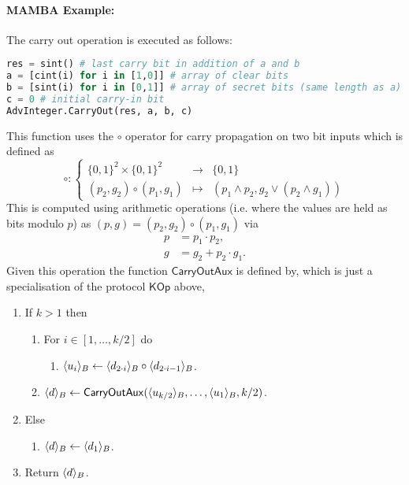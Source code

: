\paragraph{MAMBA Example:}  The carry out operation is executed as follows: 
\begin{lstlisting}[language={python}]
res = sint() # last carry bit in addition of a and b
a = [cint(i) for i in [1,0]] # array of clear bits
b = [sint(i) for i in [0,1]] # array of secret bits (same length as a)
c = 0 # initial carry-in bit
AdvInteger.CarryOut(res, a, b, c)
\end{lstlisting}

This function uses the $\circ$ operator for carry propagation on two
bit inputs which is defined as
\[  \circ:  \left\{ \begin{array}{ccc}
			\{0,1\}^2 \times \{0,1\}^2 & \longrightarrow & \{0,1\} \\
			(p_2,g_2) \circ (p_1,g_1) & \longmapsto &
			 (p_1 \wedge p_2, g_2 \vee (p_2 \wedge g_1))
		     \end{array} \right.
\]
This is computed using arithmetic operations (i.e. where the values are
held as bits modulo $p$) as $(p,g) = (p_2,g_2) \circ (p_1,g_1)$ via
\begin{align*}
	p &= p_1 \cdot p_2, \\
	g &= g_2 + p_2 \cdot g_1.
\end{align*}
Given this operation the function $\mathsf{CarryOutAux}$ is defined by,
which is just a specialisation of the protocol $\mathsf{KOp}$ above,
\begin{enumerate}
\item If $k>1$ then
\begin{enumerate}
  \item For $i \in [1,\ldots,k/2]$ do
  \begin{enumerate}
     \item $\langle u_i \rangle_B \leftarrow \langle d_{2\cdot i} \rangle_B \circ \langle d_{2 \cdot i-1} \rangle_B$.
  \end{enumerate}
  \item $\langle d \rangle_B \leftarrow \mathsf{CarryOutAux}(\langle u_{k/2} \rangle_B,\ldots,\langle u_1 \rangle_B,k/2)$.
\end{enumerate}
\item Else
\begin{enumerate}
   \item $\langle d \rangle_B \leftarrow \langle d_1 \rangle_B$.
\end{enumerate}
\item Return $\langle d \rangle_B$.
\end{enumerate}
